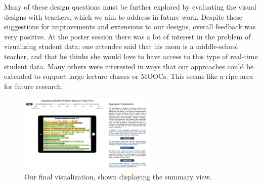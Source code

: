 \documentclass{sigchi}
\begin{document}
Many of these design questions must be further explored by evaluating the visual designs with teachers, which we aim to address in future work. Despite these suggestions for improvements and extensions to our designs, overall feedback was very positive. At the poster session there was a lot of interest in the problem of visualizing student data; one attendee said that his mom is a middle-school teacher, and that he thinks she would love to have access to this type of real-time student data. Many others were interested in ways that our approaches could be extended to support large lecture classes or MOOCs. This seems like a ripe area for future research.






\begin{figure}[t]
\centering
\includegraphics[width=65mm]{images/results1.pdf}
\caption{Our final visualization, shown displaying the summary view.}
\label{fig:Website}
\end{figure}
\end{document}

